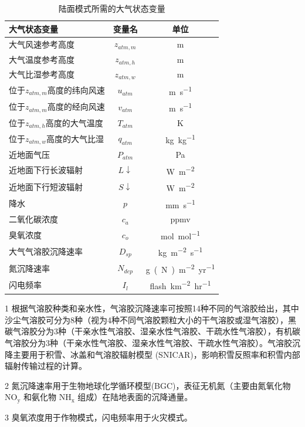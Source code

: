 \begin{table}[]
\centering
\caption{陆面模式所需的大气状态变量}
\label{tab:陆面模式所需的大气状态变量}
\begin{threeparttable}
\begin{tabular}{lcc}
\toprule
大气状态变量               & 变量名           & 单位           \\  \midrule
大气风速参考高度             & $z_{atm,m}$   & m            \\
大气温度参考高度             & $z_{atm,h}$   & m            \\
大气比湿参考高度             & $z_{atm,w}$   & m            \\
位于$z_{atm,m}$高度的纬向风速 & $u_{atm}$     & \unit{m.s^{-1}}   \\
位于$z_{atm,m}$高度的经向风速 & $v_{atm}$     & \unit{m.s^{-1}}   \\
位于$z_{atm,h}$高度的大气温度 & $T_{atm}$     & K            \\
位于$z_{atm,w}$高度的大气比湿 & $q_{atm}$     & \unit{kg.kg^{-1}} \\
近地面气压                & $P_{atm}$     & Pa           \\
近地面下行长波辐射            & $L\downarrow$ & \unit{W.m^{-2}}   \\
近地面下行短波辐射            & $S\downarrow$ & \unit{W.m^{-2}}   \\
降水                   & $p$           & \unit{mm.s^{-1}}      \\
二氧化碳浓度               & $c_a$         & ppmv         \\
臭氧浓度                 & $c_o$         & \unit{mol.mol^{-1}}  \\
大气气溶胶沉降速率        & $D_{sp}$      & \unit{kg.m^{-2}.s^{-1}}  \\
氮沉降速率                & $N_{dep}$     & \unit{g(N).m^{-2}.yr^{-1}}   \\
闪电频率                 & $I_l$         & \unit{flash.km^{-2}.hr^{-1}} \\ \bottomrule    
\end{tabular}
\begin{tablenotes}
\footnotesize
\item[1] 根据气溶胶种类和亲水性，气溶胶沉降速率可按照14种不同的气溶胶给出，其中沙尘气溶胶可分为8种（视为4种不同气溶胶颗粒大小的干气溶胶或湿气溶胶），黑碳气溶胶分为3种（干亲水性气溶胶、湿亲水性气溶胶、干疏水性气溶胶），有机碳气溶胶分为3种（干亲水性气溶胶、湿亲水性气溶胶、干疏水性气溶胶）。气溶胶沉降主要用于积雪、冰盖和气溶胶辐射模型 (SNICAR)，影响积雪反照率和积雪内部辐射传输过程的计算。 
\item[2] 氮沉降速率用于生物地球化学循环模型(BGC)，表征无机氮（主要由氮氧化物 $\mathrm{NO_y}$ 和氨化物 $\mathrm{NH_x}$ 组成）在陆地表面的沉降通量。
\item[3] 臭氧浓度用于作物模式，闪电频率用于火灾模式。
\end{tablenotes}
\end{threeparttable}
\end{table}

